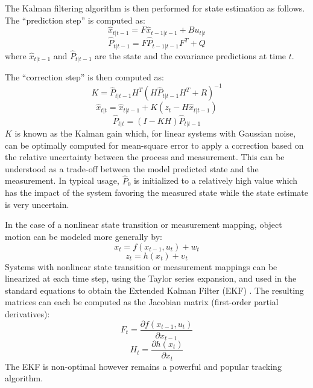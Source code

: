 \documentclass[a4paper,twoside,12pt]{report}
\begin{document}
The Kalman filtering algorithm is then performed for state estimation as follows. The ``prediction step'' is computed as:
\begin{equation}
\hat{x}_{t|t-1}=F\hat{x}_{t-1|t-1}+Bu_{t|t}
\end{equation}
\begin{equation}
\hat{P}_{t|t-1}=F\hat{P}_{t-1|t-1}F^T+Q 
\end{equation}
where $\hat{x}_{t|t-1}$ and $\hat{P}_{t|t-1}$ are the state and the covariance predictions at  time $t$.

The ``correction step'' is then computed as:
\begin{equation} 
K = \hat{P}_{t|t-1}H^T(H\hat{P}_{t|t-1}H^T+R)^{-1}
\end{equation}
\begin{equation} 
\hat{x}_{t|t} = \hat{x}_{t|t-1}+K(z_t-H\hat{x}_{t|t-1})
\end{equation}
\begin{equation} 
\hat{P}_{t|t}=(I-KH)\hat{P}_{t|t-1}
\end{equation}
$K$ is known as the Kalman gain which, for linear systems with Gaussian noise, can be optimally computed for mean-square error to apply a correction based on the relative uncertainty between the process and measurement. This can be understood as a trade-off between the model predicted state and the measurement. In typical usage, $\hat{P}_0$ is initialized to a relatively high value which has the impact of the system favoring the measured state while the state estimate is very uncertain.

In the case of a nonlinear state transition or measurement mapping, object motion can be modeled more generally by:
\begin{equation} 
x_t=f(x_{t-1},u_{t})+w_{t}
\end{equation}
\begin{equation} 
z_t=h(x_{t})+{\upsilon}_t
\end{equation}
Systems with nonlinear state transition or measurement mappings can be linearized at each time step, using the Taylor series expansion, and used in the standard equations to obtain the Extended Kalman Filter (EKF) \citep{trackbook}. The resulting matrices can each be computed as the Jacobian matrix (first-order partial derivatives):
\begin{equation}
F_t = \frac{\partial f(x_{t-1}, u_{t})}{\partial x_{t-1}}
\end{equation}
\begin{equation} 
H_t = \frac{\partial h(x_{t})}{\partial x_t} 
\end{equation}
The EKF is non-optimal however remains a powerful and popular tracking algorithm.
\end{document}
